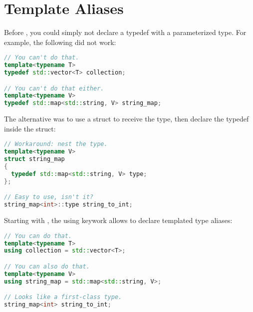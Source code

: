 \section{Template Aliases}

Before , you could simply not declare a typedef with a
parameterized type. For example, the following did not work:

\begin{lstlisting}[language=c++]
// You can't do that.
template<typename T>
typedef std::vector<T> collection;

// You can't do that either.
template<typename V>
typedef std::map<std::string, V> string_map;
\end{lstlisting}

The alternative was to use a struct to receive the type, then declare
the typedef inside the struct:

\begin{lstlisting}[language=c++]
// Workaround: nest the type.
template<typename V>
struct string_map
{
  typedef std::map<std::string, V> type;
};

// Easy to use, isn't it?
string_map<int>::type string_to_int;
\end{lstlisting}

Starting with , the using keywork allows to declare templated
type aliases:

\begin{lstlisting}[language=c++]
// You can do that.
template<typename T>
using collection = std::vector<T>;

// You can also do that.
template<typename V>
using string_map = std::map<std::string, V>;

// Looks like a first-class type.
string_map<int> string_to_int;
\end{lstlisting}

